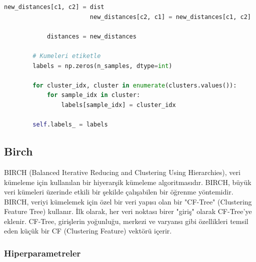 \begin{lstlisting}[language=Python, caption=Scikit-learn'de AgglomerativeClustering.]
                        new_distances[c1, c2] = dist
                        new_distances[c2, c1] = new_distances[c1, c2]

            distances = new_distances

        # Kumeleri etiketle
        labels = np.zeros(n_samples, dtype=int)
    
        for cluster_idx, cluster in enumerate(clusters.values()):
            for sample_idx in cluster:
                labels[sample_idx] = cluster_idx
    
        self.labels_ = labels
\end{lstlisting}

\newpage

\subsection{Birch}
BIRCH (Balanced Iterative Reducing and Clustering Using Hierarchies), veri kümeleme için kullanılan bir hiyerarşik kümeleme algoritmasıdır. BIRCH, büyük veri kümeleri üzerinde etkili bir şekilde çalışabilen bir öğrenme yöntemidir. BIRCH, veriyi kümelemek için özel bir veri yapısı olan bir "CF-Tree" (Clustering Feature Tree) kullanır. İlk olarak, her veri noktası birer "giriş" olarak CF-Tree'ye eklenir. CF-Tree, girişlerin yoğunluğu, merkezi ve varyansı gibi özellikleri temsil eden küçük bir CF (Clustering Feature) vektörü içerir.

\subsubsection{Hiperparametreler}

\begin{table}[h]
\centering
{\scriptsize\renewcommand{\arraystretch}{0.4}
{}}
\end{table}

